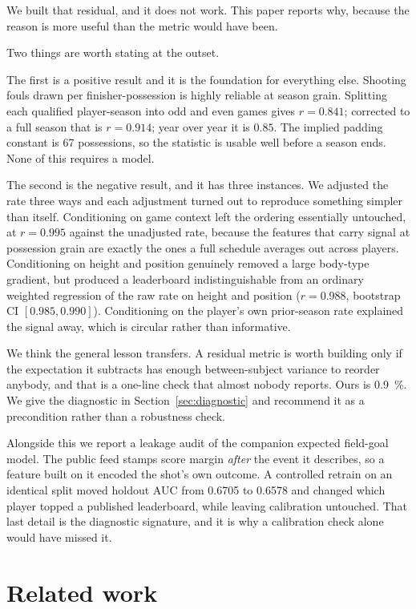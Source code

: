 \documentclass[11pt,letterpaper]{article}
\begin{document}
We built that residual, and it does not work. This paper reports why, because
the reason is more useful than the metric would have been.

Two things are worth stating at the outset.

The first is a positive result and it is the foundation for everything else.
Shooting fouls drawn per finisher-possession is highly reliable at season grain.
Splitting each qualified player-season into odd and even games gives
$r = 0.841$; corrected to a full season that is $r = 0.914$; year over year it
is $0.85$. The implied padding constant is 67 possessions, so the statistic is
usable well before a season ends. None of this requires a model.

The second is the negative result, and it has three instances. We adjusted the
rate three ways and each adjustment turned out to reproduce something simpler
than itself. Conditioning on game context left the ordering essentially
untouched, at $r = 0.995$ against the unadjusted rate, because the features that
carry signal at possession grain are exactly the ones a full schedule averages
out across players. Conditioning on height and position genuinely removed a
large body-type gradient, but produced a leaderboard indistinguishable from an
ordinary weighted regression of the raw rate on height and position
($r = 0.988$, bootstrap CI $[0.985, 0.990]$). Conditioning on the player's own
prior-season rate explained the signal away, which is circular rather than
informative.

We think the general lesson transfers. A residual metric is worth building only
if the expectation it subtracts has enough between-subject variance to reorder
anybody, and that is a one-line check that almost nobody reports. Ours is
\SI{0.9}{\percent}. We give the diagnostic in Section~\ref{sec:diagnostic} and
recommend it as a precondition rather than a robustness check.

Alongside this we report a leakage audit of the companion expected field-goal
model. The public feed stamps score margin \emph{after} the event it describes,
so a feature built on it encoded the shot's own outcome. A controlled retrain on
an identical split moved holdout AUC from 0.6705 to 0.6578 and changed which
player topped a published leaderboard, while leaving calibration untouched. That
last detail is the diagnostic signature, and it is why a calibration check alone
would have missed it.

\section{Related work}
\end{document}
